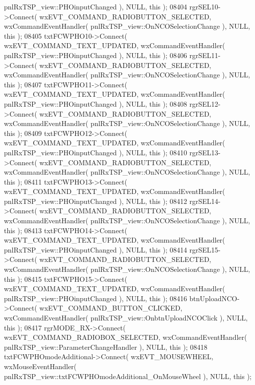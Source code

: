\begin{DoxyCode}
      pnlRxTSP_view::PHOinputChanged ), NULL, \textcolor{keyword}{this} );
08404     rgrSEL10->Connect( wxEVT\_COMMAND\_RADIOBUTTON\_SELECTED, wxCommandEventHandler( 
      pnlRxTSP_view::OnNCOSelectionChange ), NULL, \textcolor{keyword}{this} );
08405     txtFCWPHO10->Connect( wxEVT\_COMMAND\_TEXT\_UPDATED, wxCommandEventHandler( 
      pnlRxTSP_view::PHOinputChanged ), NULL, \textcolor{keyword}{this} );
08406     rgrSEL11->Connect( wxEVT\_COMMAND\_RADIOBUTTON\_SELECTED, wxCommandEventHandler( 
      pnlRxTSP_view::OnNCOSelectionChange ), NULL, \textcolor{keyword}{this} );
08407     txtFCWPHO11->Connect( wxEVT\_COMMAND\_TEXT\_UPDATED, wxCommandEventHandler( 
      pnlRxTSP_view::PHOinputChanged ), NULL, \textcolor{keyword}{this} );
08408     rgrSEL12->Connect( wxEVT\_COMMAND\_RADIOBUTTON\_SELECTED, wxCommandEventHandler( 
      pnlRxTSP_view::OnNCOSelectionChange ), NULL, \textcolor{keyword}{this} );
08409     txtFCWPHO12->Connect( wxEVT\_COMMAND\_TEXT\_UPDATED, wxCommandEventHandler( 
      pnlRxTSP_view::PHOinputChanged ), NULL, \textcolor{keyword}{this} );
08410     rgrSEL13->Connect( wxEVT\_COMMAND\_RADIOBUTTON\_SELECTED, wxCommandEventHandler( 
      pnlRxTSP_view::OnNCOSelectionChange ), NULL, \textcolor{keyword}{this} );
08411     txtFCWPHO13->Connect( wxEVT\_COMMAND\_TEXT\_UPDATED, wxCommandEventHandler( 
      pnlRxTSP_view::PHOinputChanged ), NULL, \textcolor{keyword}{this} );
08412     rgrSEL14->Connect( wxEVT\_COMMAND\_RADIOBUTTON\_SELECTED, wxCommandEventHandler( 
      pnlRxTSP_view::OnNCOSelectionChange ), NULL, \textcolor{keyword}{this} );
08413     txtFCWPHO14->Connect( wxEVT\_COMMAND\_TEXT\_UPDATED, wxCommandEventHandler( 
      pnlRxTSP_view::PHOinputChanged ), NULL, \textcolor{keyword}{this} );
08414     rgrSEL15->Connect( wxEVT\_COMMAND\_RADIOBUTTON\_SELECTED, wxCommandEventHandler( 
      pnlRxTSP_view::OnNCOSelectionChange ), NULL, \textcolor{keyword}{this} );
08415     txtFCWPHO15->Connect( wxEVT\_COMMAND\_TEXT\_UPDATED, wxCommandEventHandler( 
      pnlRxTSP_view::PHOinputChanged ), NULL, \textcolor{keyword}{this} );
08416     btnUploadNCO->Connect( wxEVT\_COMMAND\_BUTTON\_CLICKED, wxCommandEventHandler( 
      pnlRxTSP_view::OnbtnUploadNCOClick ), NULL, \textcolor{keyword}{this} );
08417     rgrMODE_RX->Connect( wxEVT\_COMMAND\_RADIOBOX\_SELECTED, wxCommandEventHandler( 
      pnlRxTSP_view::ParameterChangeHandler ), NULL, \textcolor{keyword}{this} );
08418     txtFCWPHOmodeAdditional->Connect( wxEVT\_MOUSEWHEEL, wxMouseEventHandler( 
      pnlRxTSP_view::txtFCWPHOmodeAdditional_OnMouseWheel ), NULL, \textcolor{keyword}{this} );

\end{DoxyCode}

